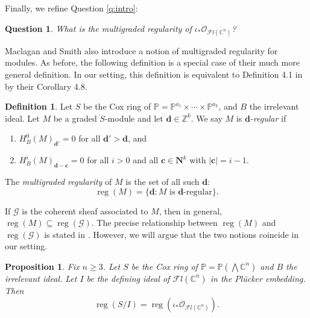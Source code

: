 \documentclass[12pt,reqno]{amsart}
\newtheorem{proposition}[theorem]{Proposition}
\newtheorem{question}[theorem]{Question}
\theoremstyle{definition}
\newtheorem{definition}[theorem]{Definition}
\theoremstyle{remark}
\newcommand{\reg}{\operatorname{reg}}
\newcommand{\calF}{{\mathcal{F}}}
\newcommand{\calO}{{\mathcal{O}}}
\begin{document}
Finally, we refine Question \ref{q:intro}:

\begin{question}
    What is the multigraded regularity of $\iota_*\calO_{\calF l(\mathbb C^n)}$?
\end{question}

Maclagan and Smith also introduce a notion of multigraded regularity for modules.  As before, the following definition is a special case of their much more general definition.  In our setting, this definition is equivalent to Definition 4.1 in \cite{MaclaganSmith2004} by their Corollary 4.8.

\begin{definition}\label{defn:regModule}
    Let $S$ be the Cox ring of $\mathbb P = \mathbb P^{a_1}\times\cdots\times\mathbb P^{a_k}$, and $B$ the irrelevant ideal. Let $M$ be a graded $S$-module and let $\mathbf d \in \mathbb Z^k$.  We say $M$ is \textit{$\mathbf d$-regular} if 
    \begin{enumerate}
        \item $H^0_B(M)_{\mathbf d'}=0$ for all $\mathbf d' > \mathbf d$, and
        \item $H^i_B(M)_{\mathbf d -\mathbf c} = 0$ for all $i>0$ and all $\mathbf c \in \mathbf N^k$ with $|\mathbf c| = i-1$. 
        
    \end{enumerate}
    
    The \textit{multigraded regularity} of $M$ is the set of all such $\mathbf d$:
    \[
    \reg(M) = \{\mathbf d: M \text{ is } \mathbf d\text{-regular}\}.
    \]
\end{definition}

If $\mathcal G$ is the coherent sheaf associated to $M$, then in general, $\reg(M) \subseteq \reg(\mathcal G)$.  The precise relationship between $\reg(M)$ and $\reg(\mathcal G)$ is stated in \cite[Proposition 6.4]{MaclaganSmith2004}.  However, we will argue that the two notions coincide in our setting.  

\begin{proposition}\label{prop:sheafVsModule}
    Fix $n \geq 3$.  Let $S$ be the Cox ring of $\mathbb P = \mathbb P \left(\bigwedge \mathbb C^n\right)$ and $B$ the irrelevant ideal.  Let $I$ be the defining ideal of $\calF l(\mathbb C^n)$ in the Pl\"ucker embedding.  Then \[\reg(S/I) = \reg(\iota_*\calO_{\calF l(\mathbb C^n)}).\]
\end{proposition}
\end{document}

